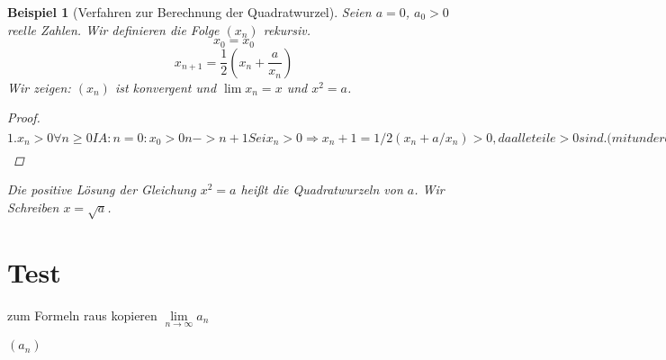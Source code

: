 \documentclass[a4paper,titlepage,oneside]{article}
\def\toinf{\ensuremath{\rightarrow \infty}}
\theoremstyle{thmstyle}
\newtheorem{bsp}[satz]{Beispiel}
\begin{document}
\begin{bsp}[Verfahren zur Berechnung der Quadratwurzel]
Seien $a = 0$, $a_0 > 0$ reelle Zahlen. Wir definieren die Folge $(x_n)$ rekursiv.\\
\[x_0 = x_0\]
\[x_{n+1} =  \frac{1}{2}\left(x_n + \frac{a}{x_n}\right) \]
Wir zeigen: $(x_n)$ ist konvergent und $\lim{x_n} = x$ und $x^2 = a$.
\begin{proof}$
1. x_n >0 \forall n \ge 0
IA: n=0: x_0 > 0
n -> n+1
Sei x_n > 0 \Rightarrow x_n+1 = 1/2 (x_n + a/x_n) > 0 , da alle teile > 0 sind.(mit under brace und overbrace
d.h. (x_n) ist nach unten durch 0 beschränkt.
2. x_n^2 \ge a \forall n >= 1
denn x_{n+1}^2 - a = (1/4(x_n + a/x_n)^2  - a = ... a in klammer rein zieihen und ausrechnen ... = 1/4 (mals a quradrat) >= 0
3. (x_n) ist monoton fallend
x_n - x_{n+1} = x_n - 1/2 (x_n + a/x_n) = (x_n in klammer rein zeihen und ausrehcnen ) = 1/(2x_n)(x_n^2 - a) > =  weil beides >= 0 (x_n > 0)
\Rightarrow x_>n >= x_{n+1}
Nach dem Monotonie-Kriterium ist (x_n) konvergent.
4. Sei x= \lim\limits{n \toinf}x_n \Rightarrow x = \lim\limits{n \toinf}x_{n+1} = \lim\limits{n \toinf}{\frac{1}{2}\left(x_n + \frac{a}{x_n}\right)} = \frac{1}{2}\left(\lim\limits{n \toinf}x_n + \frac{a}{\lim\limits{n \toinf}x_n}\right) =  \frac{1}{2}\left(x + \frac{a}{x}\right) \Rightarrow 2x = x + a/x \Rightarrow x = a/x \Rightarrow x^2 = a.$
\end{proof}
Die positive Lösung der Gleichung $x^2 = a$ heißt die Quadratwurzeln von $a$. Wir Schreiben $x = \sqrt{a}$.
\end{bsp}








\newpage
\section{Test}
zum Formeln raus kopieren
\begin{math}
\lim\limits_{n \toinf}{a_n}
\end{math}

$(a_n)$
\end{document}
